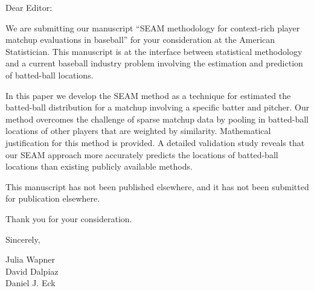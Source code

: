 \documentclass[11pt]{article}
\begin{document}
\footnotesize

\normalsize 


Dear Editor: 

We are submitting our manuscript ``SEAM methodology for context-rich player matchup evaluations in baseball'' for your consideration at the American Statistician. This manuscript is at the interface between statistical methodology and a current baseball industry problem involving the estimation and prediction of batted-ball locations. 

In this paper we develop the SEAM method as a technique for estimated the batted-ball distribution for a matchup involving a specific batter and pitcher. Our method overcomes the challenge of sparse matchup data by pooling in batted-ball locations of other players that are weighted by similarity. Mathematical justification for this method is provided. A detailed validation study reveals that our SEAM approach more accurately predicts the locations of batted-ball locations than existing publicly available methods.

This manuscript has not been published elsewhere, and it has not been submitted for publication elsewhere.

Thank you for your consideration.

Sincerely,

Julia Wapner \\
David Dalpiaz \\
Daniel J. Eck
\end{document}
